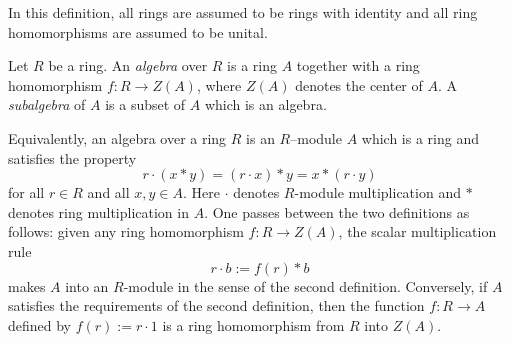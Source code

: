 \documentclass{article}
\begin{document}
In this definition, all rings are assumed to be rings with identity and all ring homomorphisms are assumed to be unital.

Let $R$ be a ring. An \emph{algebra} over $R$ is a ring $A$ together with a ring homomorphism $f\colon R \to Z(A)$, where $Z(A)$ denotes the center of $A$. A \emph{subalgebra} of $A$ is a subset of $A$ which is an algebra.

Equivalently, an algebra over a ring $R$ is an $R$--module $A$ which is a ring and satisfies the property
$$r\cdot(x*y) = (r\cdot x)*y = x*(r\cdot y)$$
for all $r \in R$ and all $x,y \in A$. Here $\cdot$ denotes $R$-module multiplication and $*$ denotes ring multiplication in $A$. One passes between the two definitions as follows: given any ring homomorphism $f\colon R \longrightarrow Z(A)$, the scalar multiplication rule
$$
r \cdot b := f(r)*b
$$
makes $A$ into an $R$-module in the sense of the second definition. Conversely, if $A$ satisfies the requirements of the second definition, then the function $f\colon R \to A$ defined by $f(r) := r \cdot 1$ is a ring homomorphism from $R$ into $Z(A)$.
\end{document}
